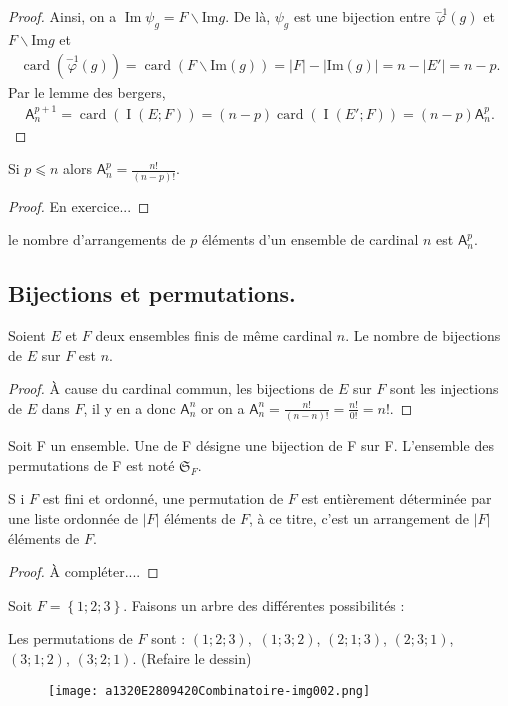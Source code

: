 \begin{proof}
Ainsi, on a \(\operatorname{Im}𝜓_{𝑔}=𝐹∖\text{Im}𝑔\). De là, \(𝜓_{𝑔}\) est une bijection entre \(\overset{-1}{𝜑}(𝑔)\) et
\(𝐹∖\text{Im}𝑔\) et
\begin{gather*}
\operatorname{card}\left(\overset{-1}{𝜑}(𝑔)\right)=\operatorname{card}\left(𝐹∖\text{Im}(𝑔)\right)=\left|𝐹\right|-\left|\text{Im}(𝑔)\right|=𝑛-\left|𝐸'\right|=𝑛-𝑝.
\end{gather*}
Par le lemme des bergers,
\begin{gather*}
𝖠_𝑛^{𝑝+1}=\operatorname{card}\left(\operatorname{I}(𝐸;𝐹)\right)=(𝑛-𝑝)\operatorname{card}\left(\operatorname{I}(𝐸';𝐹)\right)=(𝑛-𝑝)𝖠^𝑝_𝑛.
\end{gather*}
\end{proof}
%
\begin{theorem}
Si \(𝑝⩽𝑛\) alors \( 𝖠^𝑝_𝑛=\frac{𝑛!}{(𝑛-𝑝)!}\).
\end{theorem}
\begin{proof}
En exercice...
\end{proof}
\begin{remark}
le nombre d'arrangements de \(𝑝\) éléments d'un ensemble de cardinal
\(𝑛\) est \(𝖠^𝑝_𝑛\).
\end{remark}
\subsection{Bijections et permutations.}
\begin{proposition}
Soient \(𝐸\) et \(𝐹\) deux ensembles finis de même cardinal \(𝑛\). Le nombre de bijections de \(𝐸\) sur \(𝐹\) est
\(𝑛\).
\end{proposition}
\begin{proof}
À cause du cardinal commun, les bijections de \(𝐸\) sur \(𝐹\) sont les injections de \(𝐸\) dans \(𝐹\), il y en a donc
\(𝖠_𝑛^{𝑛}\) or on a \(𝖠_𝑛^{𝑛}=\frac{𝑛!}{(𝑛-𝑛)!}=\frac{𝑛!}{0!}=𝑛!\).
\end{proof}
\begin{definition}
[Permutation]
Soit F un ensemble. Une  de F désigne une bijection de F sur F.
L’ensemble des permutations de F est noté \(𝔖_{𝐹}\).
\end{definition}
\begin{theorem}
S i \(𝐹\) est fini et ordonné, une permutation de \(𝐹\) est entièrement déterminée par une liste
ordonnée de \(\left|𝐹\right|\) éléments de \(𝐹\), à ce titre, c’est un arrangement de \(\left|𝐹\right|\) éléments de
\(𝐹\).
\end{theorem}
\begin{proof}
À compléter....
\end{proof}
\begin{example}
Soit \(𝐹=\left\{1;2;3\right\}\). Faisons un arbre des différentes possibilités :

Les permutations de \(𝐹\) sont : \((1;2;3),\)  \((1;3;2)\), \((2;1;3)\), \((2;3;1)\), \((3;1;2)\), \((3;2;1)\). (Refaire
le dessin)
\begin{figure}
\centering
\texttt{[image: a1320E2809420Combinatoire-img002.png]}
\end{figure}
\end{example}

